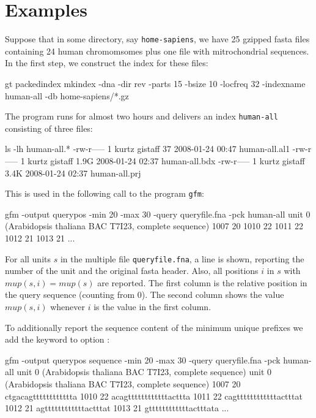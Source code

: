 \documentclass[12pt]{article}
\newcommand{\GFM}[0]{\texttt{gfm}\xspace}
\newcommand{\Mup}[1]{\mathit{mup(s,#1)}}
\newcommand{\Lmin}[0]{\mathit{mup(s)}}
\begin{document}
\section{Examples}

Suppose that in some directory, say \texttt{home-sapiens}, we have 25 gzipped
fasta files containing 24 human chromomsomes plus one file with mitrochondrial
sequences.  In the first step, we construct the index for these files:

\begin{Output}
gt packedindex mkindex -dna -dir rev -parts 15 -bsize 10 -locfreq 32
                       -indexname human-all -db home-sapiens/*.gz
\end{Output}

The program runs for almost two hours and delivers 
an index \texttt{human-all} consisting of three files:

\begin{Output}
ls -lh human-all.*
-rw-r----- 1 kurtz gistaff   37 2008-01-24 00:47 human-all.al1
-rw-r----- 1 kurtz gistaff 1.9G 2008-01-24 02:37 human-all.bdx
-rw-r----- 1 kurtz gistaff 3.4K 2008-01-24 02:37 human-all.prj
\end{Output}

This is used in the following call to the program \GFM:

\begin{Output}
gfm -output querypos -min 20 -max 30 -query queryfile.fna -pck human-all
unit 0 (Arabidopsis thaliana BAC T7I23, complete sequence)
1007 20
1010 22
1011 22
1012 21
1013 21
...
\end{Output}

For all units \(s\) in the multiple \Fasta file \texttt{queryfile.fna},
a line is shown, reporting the number of the unit and the original fasta
header. Also, all positions \(i\) in \(s\) with \(\Mup{i}=\Lmin\) are reported.
The first column is the relative position in the query sequence (counting 
from 0). The second column shows the value \(\Mup{i}\) whenever
\(i\) is the value in the first column.

To additionally report the sequence content of the
minimum unique prefixes we add the keyword  to option
:

\begin{Output}
gfm -output querypos sequence -min 20 -max 30 -query queryfile.fna -pck human-all
unit 0 (Arabidopsis thaliana BAC T7I23, complete sequence)
unit 0 (Arabidopsis thaliana BAC T7I23, complete sequence)
1007 20 ctgacagtttttttttttta
1010 22 acagttttttttttttacttta
1011 22 cagttttttttttttactttat
1012 21 agttttttttttttactttat
1013 21 gttttttttttttactttata
...
\end{Output}
\end{document}
